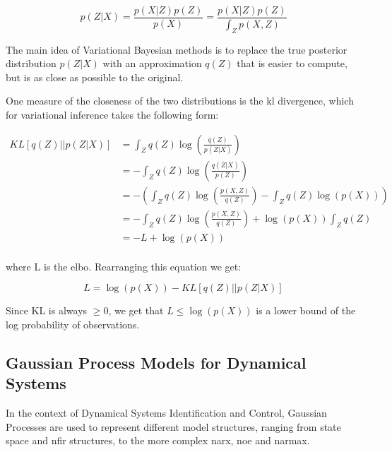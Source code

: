 \begin{equation}
    p(Z|X) = \frac{p(X|Z)p(Z)}{p(X)} = \frac{p(X|Z)p(Z)}{\int_Z p(X,Z)}
\end{equation}

The main idea of Variational Bayesian methods is to replace the true posterior
distribution $p(Z|X)$ with an approximation $q(Z)$ that is easier to compute,
but is as close as possible to the original. 

One measure of the closeness of the two distributions is the \acrfull{kl}
divergence, which for variational inference takes the following form:


\vspace{5pt}
\begin{equation}
    \begin{aligned}
        KL\left[q(Z)||p(Z|X)\right] 
        &= \int_Z q(Z)\log{\left(\frac{q(Z)}{p(Z|X)}\right)} \\
        &= - \int_Z q(Z)\log{\left(\frac{q(Z|X)}{p(Z)}\right)} \\
        &= - \left(
                \int_Z q(Z)\log{\left(\frac{p(X,Z)}{q(Z)}\right)}
                        - \int_Z q(Z)\log{\left(p(X)\right)}
            \right) \\
        &= - \int_Z q(Z) \log{\left(\frac{p(X,Z)}{q(Z)}\right)}
            + \log{\left(p(X)\right)}\int_Z q(Z) \\
        &= -L + \log{\left(p(X)\right)} \\
    \end{aligned}
\end{equation}
\vspace{5pt}

where L is the \acrfull{elbo}. Rearranging this equation we get: 

\begin{equation}
    L = \log{\left(p(X)\right)} - KL\left[q(Z)||p(Z|X)\right] 
\end{equation}

Since KL is always $\geq 0$, we get that $L \leq \log{\left(p(X)\right)}$ is a
lower bound of the log probability of observations.

\subsection{Gaussian Process Models for Dynamical
Systems}\label{sec:gp_dynamical_system}

In the context of Dynamical Systems Identification and Control, Gaussian
Processes are used to represent different model structures, ranging from state
space and \acrshort{nfir} structures, to the more complex \acrshort{narx},
\acrshort{noe} and \acrshort{narmax}. 


